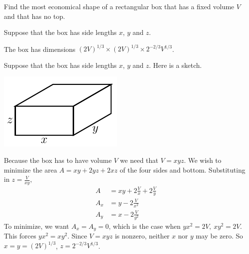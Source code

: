 \begin{question}
Find the most economical shape of a rectangular box that has
a fixed volume $V$ and that has no top.
\end{question}

\begin{hint}
Suppose that the box has side lengths $x$, $y$ and $z$.
\end{hint}

\begin{answer}
The box has dimensions $(2V)^{1/3}\times(2V)^{1/3}\times 2^{-2/3}V^{1/3}$.
\end{answer}

\begin{solution}
Suppose that the box has side lengths $x$, $y$ and $z$.
Here is a sketch.
\begin{center}
     \includegraphics{fig/box.pdf}
\end{center}
Because the box has to have volume $V$ we need that $V=xyz$.
We wish to minimize the area $A=xy+2yz+2xz$ of the four sides and bottom.
Substituting in $z=\frac{V}{xy}$,
\begin{align*}
A&=xy+2\frac{V}{x}+2\frac{V}{y}\\
A_x&=y-2\frac{V}{x^2}\\
A_y&=x-2\frac{V}{y^2}
\end{align*}
To minimize, we want $A_x=A_y=0$, which is the case when $yx^2=2V,\ xy^2=2V$.
This forces $yx^2=xy^2$. Since $V=xyz$ is nonzero, neither $x$ nor $y$
may be zero. So $x=y=(2V)^{1/3}$, $z=2^{-2/3}V^{1/3}$.
\end{solution}



\subsection*{\Application}

